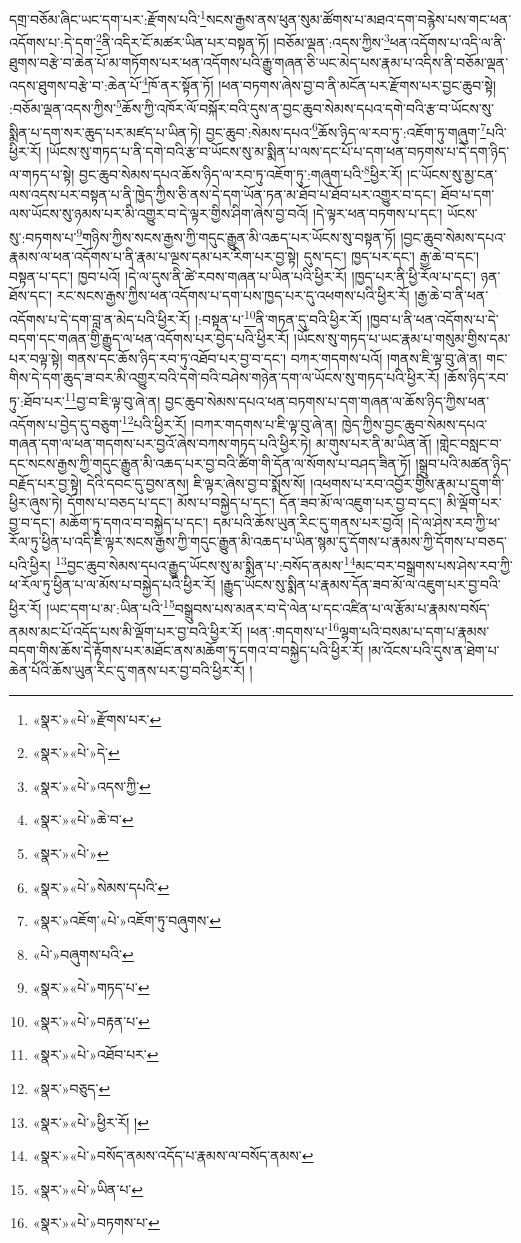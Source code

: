 དགྲ་བཅོམ་ཞིང་ཡང་དག་པར་:རྫོགས་པའི་\footnote{«སྣར་»«པེ་»རྫོགས་པར་}སངས་རྒྱས་ནས་ཕུན་སུམ་ཚོགས་པ་མཐའ་དག་བརྙེས་པས་གང་ཕན་འདོགས་པ་:དེ་དག་\footnote{«སྣར་»«པེ་»དེ་}ནི་འདིར་ངོ་མཚར་ཡིན་པར་བསྟན་ཏོ། །བཅོམ་ལྡན་:འདས་ཀྱིས་\footnote{«སྣར་»«པེ་»འདས་ཀྱི་}ཕན་འདོགས་པ་འདི་ལ་ནི་ཐུགས་བརྩེ་བ་ཆེན་པོ་མ་གཏོགས་པར་ཕན་འདོགས་པའི་རྒྱུ་གཞན་ཅི་ཡང་མེད་པས་རྣམ་པ་འདིས་ནི་བཅོམ་ལྡན་འདས་ཐུགས་བརྩེ་བ་:ཆེན་པོ་\footnote{«སྣར་»«པེ་»ཆེ་བ་}ཁོ་ནར་སྟོན་ཏོ། །ཕན་བཏགས་ཞེས་བྱ་བ་ནི་མངོན་པར་རྫོགས་པར་བྱང་ཆུབ་སྟེ། :བཅོམ་ལྡན་འདས་ཀྱིས་\footnote{«སྣར་»«པེ་»}ཆོས་ཀྱི་འཁོར་ལོ་བསྐོར་བའི་དུས་ན་བྱང་ཆུབ་སེམས་དཔའ་དགེ་བའི་རྩ་བ་ཡོངས་སུ་སྨིན་པ་དག་སར་ཆུད་པར་མཛད་པ་ཡིན་ཏེ། བྱང་ཆུབ་:སེམས་དཔའ་\footnote{«སྣར་»«པེ་»སེམས་དཔའི་}ཆོས་ཉིད་ལ་རབ་ཏུ་:འཇོག་ཏུ་གཞུག་\footnote{«སྣར་»འཇོག་«པེ་»འཇོག་ཏུ་བཞུགས་}པའི་ཕྱིར་རོ། །ཡོངས་སུ་གཏད་པ་ནི་དགེ་བའི་རྩ་བ་ཡོངས་སུ་མ་སྨིན་པ་ལས་དང་པོ་པ་དག་ཕན་བཏགས་པ་དེ་དག་ཉིད་ལ་གཏད་པ་སྟེ། བྱང་ཆུབ་སེམས་དཔའ་ཆོས་ཉིད་ལ་རབ་ཏུ་འཇོག་ཏུ་:གཞུག་པའི་\footnote{«པེ་»བཞུགས་པའི་}ཕྱིར་རོ། །ང་ཡོངས་སུ་མྱ་ངན་ལས་འདས་པར་བསྟན་པ་ནི་ཁྱེད་ཀྱིས་ཅི་ནས་དེ་དག་ཡོན་ཏན་མ་ཐོབ་པ་ཐོབ་པར་འགྱུར་བ་དང་། ཐོབ་པ་དག་ལས་ཡོངས་སུ་ཉམས་པར་མི་འགྱུར་བ་དེ་ལྟར་གྱིས་ཤིག་ཞེས་བྱ་བའོ། །དེ་ལྟར་ཕན་བཏགས་པ་དང་། ཡོངས་སུ་:བཏགས་པ་\footnote{«སྣར་»«པེ་»གཏད་པ་}གཉིས་ཀྱིས་སངས་རྒྱས་ཀྱི་གདུང་རྒྱུན་མི་འཆད་པར་ཡོངས་སུ་བསྟན་ཏོ། །བྱང་ཆུབ་སེམས་དཔའ་རྣམས་ལ་ཕན་འདོགས་པ་ནི་རྣམ་པ་ལྔས་དམ་པར་རིག་པར་བྱ་སྟེ། དུས་དང་། ཁྱད་པར་དང་། རྒྱ་ཆེ་བ་དང་། བསྟན་པ་དང་། ཁྱབ་པའོ། །དེ་ལ་དུས་ནི་ཚེ་རབས་གཞན་པ་ཡིན་པའི་ཕྱིར་རོ། །ཁྱད་པར་ནི་ཕྱི་རོལ་པ་དང་། ཉན་ཐོས་དང་། རང་སངས་རྒྱས་ཀྱིས་ཕན་འདོགས་པ་དག་པས་ཁྱད་པར་དུ་འཕགས་པའི་ཕྱིར་རོ། །རྒྱ་ཆེ་བ་ནི་ཕན་འདོགས་པ་དེ་དག་བླ་ན་མེད་པའི་ཕྱིར་རོ། །:བསྟན་པ་\footnote{«སྣར་»«པེ་»བརྟན་པ་}ནི་གཏན་དུ་བའི་ཕྱིར་རོ། །ཁྱབ་པ་ནི་ཕན་འདོགས་པ་དེ་བདག་དང་གཞན་གྱི་རྒྱུད་ལ་ཕན་འདོགས་པར་བྱེད་པའི་ཕྱིར་རོ། །ཡོངས་སུ་གཏད་པ་ཡང་རྣམ་པ་གསུམ་གྱིས་དམ་པར་བལྟ་སྟེ། གནས་དང་ཆོས་ཉིད་རབ་ཏུ་འཐོབ་པར་བྱ་བ་དང་། བཀར་གདགས་པའོ། །གནས་ཇི་ལྟ་བུ་ཞེ་ན། གང་གིས་དེ་དག་ཆུད་ཟ་བར་མི་འགྱུར་བའི་དགེ་བའི་བཤེས་གཉེན་དག་ལ་ཡོངས་སུ་གཏད་པའི་ཕྱིར་རོ། །ཆོས་ཉིད་རབ་ཏུ་:ཐོབ་པར་\footnote{«སྣར་»«པེ་»འཐོབ་པར་}བྱ་བ་ཇི་ལྟ་བུ་ཞེ་ན། བྱང་ཆུབ་སེམས་དཔའ་ཕན་བཏགས་པ་དག་གཞན་ལ་ཆོས་ཉིད་ཀྱིས་ཕན་འདོགས་པ་བྱེད་དུ་བཅུག་\footnote{«སྣར་»བཅུད་}པའི་ཕྱིར་རོ། །བཀར་གདགས་པ་ཇི་ལྟ་བུ་ཞེ་ན། ཁྱེད་ཀྱིས་བྱང་ཆུབ་སེམས་དཔའ་གཞན་དག་ལ་ཕན་གདགས་པར་བྱའོ་ཞེས་བཀས་གཏད་པའི་ཕྱིར་ཏེ། མ་གུས་པར་ནི་མ་ཡིན་ནོ། །གླེང་བསླང་བ་དང་སངས་རྒྱས་ཀྱི་གདུང་རྒྱུན་མི་འཆད་པར་བྱ་བའི་ཚིག་གི་དོན་ལ་སོགས་པ་བཤད་ཟིན་ཏོ། །སྒྲུབ་པའི་མཚན་ཉིད་བརྗོད་པར་བྱ་སྟེ། དེའི་དབང་དུ་བྱས་ནས། ཇི་ལྟར་ཞེས་བྱ་བ་སྨོས་སོ། །འཕགས་པ་རབ་འབྱོར་གྱིས་རྣམ་པ་དྲུག་གི་ཕྱིར་ཞུས་ཏེ། དོགས་པ་བཅད་པ་དང་། མོས་པ་བསྐྱེད་པ་དང་། དོན་ཟབ་མོ་ལ་འཇུག་པར་བྱ་བ་དང་། མི་ལྡོག་པར་བྱ་བ་དང་། མཆོག་ཏུ་དགའ་བ་བསྐྱེད་པ་དང་། དམ་པའི་ཆོས་ཡུན་རིང་དུ་གནས་པར་བྱའོ། །དེ་ལ་ཤེས་རབ་ཀྱི་ཕ་རོལ་ཏུ་ཕྱིན་པ་འདི་ཇི་ལྟར་སངས་རྒྱས་ཀྱི་གདུང་རྒྱུན་མི་འཆད་པ་ཡིན་སྙམ་དུ་དོགས་པ་རྣམས་ཀྱི་དོགས་པ་བཅད་པའི་ཕྱིར། \footnote{«སྣར་»«པེ་»ཕྱིར་རོ། ། }བྱང་ཆུབ་སེམས་དཔའ་རྒྱུད་ཡོངས་སུ་མ་སྨིན་པ་:བསོད་ནམས་\footnote{«སྣར་»«པེ་»བསོད་ནམས་འདོད་པ་རྣམས་ལ་བསོད་ནམས་}མང་བར་བསྒྲགས་པས་ཤེས་རབ་ཀྱི་ཕ་རོལ་ཏུ་ཕྱིན་པ་ལ་མོས་པ་བསྐྱེད་པའི་ཕྱིར་རོ། །རྒྱུད་ཡོངས་སུ་སྨིན་པ་རྣམས་དོན་ཟབ་མོ་ལ་འཇུག་པར་བྱ་བའི་ཕྱིར་རོ། །ཡང་དག་པ་མ་:ཡིན་པའི་\footnote{«སྣར་»«པེ་»ཡིན་པ་}བསྒྲུབས་པས་མནར་བ་དེ་ལེན་པ་དང་འཛིན་པ་ལ་རྩོམ་པ་རྣམས་བསོད་ནམས་མང་པོ་འདོད་པས་མི་ལྡོག་པར་བྱ་བའི་ཕྱིར་རོ། །ཕན་:གདགས་པ་\footnote{«སྣར་»«པེ་»བཏགས་པ་}ལྷག་པའི་བསམ་པ་དག་པ་རྣམས་བདག་གིས་ཆོས་དེ་རྟོགས་པར་མཐོང་ནས་མཆོག་ཏུ་དགའ་བ་བསྐྱེད་པའི་ཕྱིར་རོ། །མ་འོངས་པའི་དུས་ན་ཐེག་པ་ཆེན་པོའི་ཆོས་ཡུན་རིང་དུ་གནས་པར་བྱ་བའི་ཕྱིར་རོ། །
